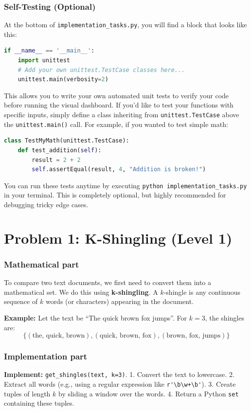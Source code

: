 \documentclass[11pt]{article}
\begin{document}
\subsubsection*{Self-Testing (Optional)}
At the bottom of \lstinline|implementation_tasks.py|, you will find a block that looks like this:
\begin{lstlisting}[language=Python]
if __name__ == '__main__':
    import unittest
    # Add your own unittest.TestCase classes here...
    unittest.main(verbosity=2)
\end{lstlisting}
This allows you to write your own automated unit tests to verify your code before running the visual dashboard. If you'd like to test your functions with specific inputs, simply define a class inheriting from \lstinline|unittest.TestCase| above the \lstinline|unittest.main()| call. For example, if you wanted to test simple math:
\begin{lstlisting}[language=Python]
class TestMyMath(unittest.TestCase):
    def test_addition(self):
        result = 2 + 2
        self.assertEqual(result, 4, "Addition is broken!")
\end{lstlisting}
You can run these tests anytime by executing \lstinline|python implementation_tasks.py| in your terminal. This is completely optional, but highly recommended for debugging tricky edge cases.

\section*{Problem 1: K-Shingling (Level 1)}

\subsubsection*{Mathematical part}
To compare two text documents, we first need to convert them into a mathematical set. We do this using \textbf{k-shingling}. A $k$-shingle is any continuous sequence of $k$ words (or characters) appearing in the document.

\textbf{Example:} Let the text be ``The quick brown fox jumps''. For $k=3$, the shingles are:
$$ \{ (\text{the, quick, brown}), (\text{quick, brown, fox}), (\text{brown, fox, jumps}) \} $$

\subsubsection*{Implementation part}
\textbf{Implement:} \lstinline|get_shingles(text, k=3)|.
1. Convert the text to lowercase.
2. Extract all words (e.g., using a regular expression like \lstinline|r'\b\w+\b'|).
3. Create tuples of length $k$ by sliding a window over the words.
4. Return a Python \lstinline|set| containing these tuples.
\end{document}
